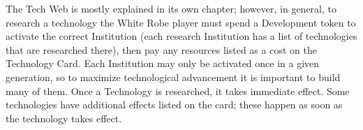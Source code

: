 The Tech Web is mostly explained in its own chapter; however, in general, to research a technology the White Robe player must spend a Development token to activate the correct Institution (each research Institution has a list of technologies that are researched there), then pay any resources listed as a cost on the Technology Card. Each Institution may only be activated once in a given generation, so to maximize technological advancement it is important to build many of them. Once a Technology is researched, it takes immediate effect. Some technologies have additional effects listed on the card; these happen as soon as the technology takes effect.
